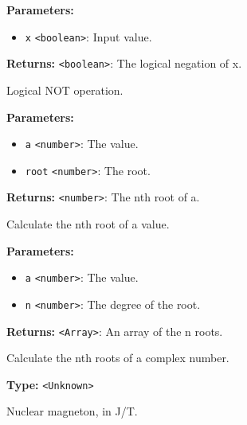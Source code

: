 \documentclass[12pt,a4paper]{article}
\begin{document}
\noindent \textbf{Parameters:}
\begin{itemize}
  \item \texttt{x} \texttt{<boolean>}: Input value.
\end{itemize}

\noindent \textbf{Returns:} \texttt{<boolean>}: The logical negation of x.

\noindent Logical NOT operation.

\vspace{5mm}
\noindent {}


\noindent \textbf{Parameters:}
\begin{itemize}
  \item \texttt{a} \texttt{<number>}: The value.
  \item \texttt{root} \texttt{<number>}: The root.
\end{itemize}

\noindent \textbf{Returns:} \texttt{<number>}: The nth root of a.

\noindent Calculate the nth root of a value.

\vspace{5mm}
\noindent {}


\noindent \textbf{Parameters:}
\begin{itemize}
  \item \texttt{a} \texttt{<number>}: The value.
  \item \texttt{n} \texttt{<number>}: The degree of the root.
\end{itemize}

\noindent \textbf{Returns:} \texttt{<Array>}: An array of the n roots.

\noindent Calculate the nth roots of a complex number.

\vspace{5mm}
\noindent {}\vspace{4mm}


\noindent \textbf{Type:} \texttt{<Unknown>}

\noindent Nuclear magneton, in J/T.

\vspace{5mm}
\noindent {}\vspace{4mm}
\end{document}
